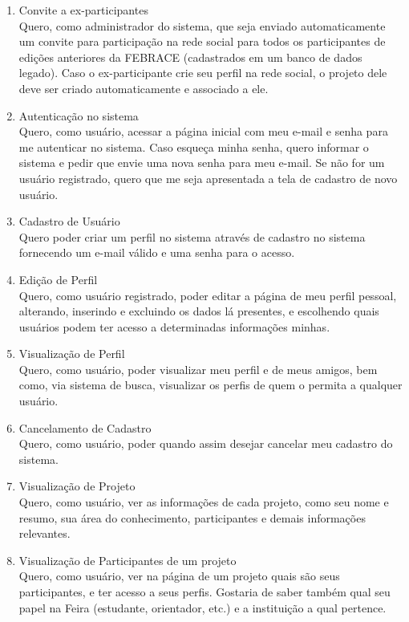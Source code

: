     \begin{enumerate}
      \item Convite a ex-participantes \\
        Quero, como administrador do sistema, que seja enviado automaticamente um convite para participação na rede social para todos os participantes de edições anteriores da FEBRACE (cadastrados em um banco de dados legado). Caso o ex-participante crie seu perfil na rede social, o projeto dele deve ser criado automaticamente e associado a ele.
      \item Autenticação no sistema \\
        Quero, como usuário, acessar a página inicial com meu e-mail e senha para me autenticar no sistema. Caso esqueça minha senha, quero informar o sistema e pedir que envie uma nova senha para meu e-mail. Se não for um usuário registrado, quero que me seja apresentada a tela de cadastro de novo usuário.
      \item Cadastro de Usuário \\
        Quero poder criar um perfil no sistema através de cadastro no sistema fornecendo um e-mail válido e uma senha para o acesso.
      \item Edição de Perfil \\
        Quero, como usuário registrado, poder editar a página de meu perfil pessoal, alterando, inserindo e excluindo os dados lá presentes, e escolhendo quais usuários podem ter acesso a determinadas informações minhas.
      \item Visualização de Perfil \\
        Quero, como usuário, poder visualizar meu perfil e de meus amigos, bem como, via sistema de busca, visualizar os perfis de quem o permita a qualquer usuário.
      \item Cancelamento de Cadastro \\
        Quero, como usuário, poder quando assim desejar cancelar meu cadastro do sistema.
      \item Visualização de Projeto \\
        Quero, como usuário, ver as informações de cada projeto, como seu nome e resumo, sua área do conhecimento, participantes e demais informações relevantes.
      \item Visualização de Participantes de um projeto \\
        Quero, como usuário, ver na página de um projeto quais são seus participantes, e ter acesso a seus perfis. Gostaria de saber também qual seu papel na Feira (estudante, orientador, etc.) e a instituição a qual pertence.

\end{enumerate}
